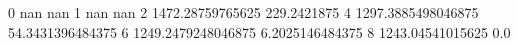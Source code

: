 0 nan nan
1 nan nan
2 1472.28759765625 229.2421875
4 1297.3885498046875 54.3431396484375
6 1249.2479248046875 6.2025146484375
8 1243.04541015625 0.0
